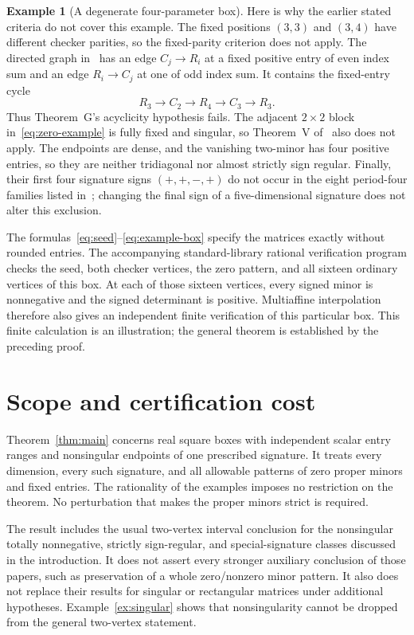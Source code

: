 \documentclass[10pt,a4paper]{article}
\theoremstyle{definition}
\newtheorem{example}[theorem]{Example}
\theoremstyle{remark}
\numberwithin{equation}{section}
\begin{document}
\begin{example}[A degenerate four-parameter box]
Here is why the earlier stated criteria do not cover this example.
The fixed positions $(3,3)$ and $(3,4)$ have different checker
parities, so the fixed-parity criterion does not apply.
The directed graph in~\cite{HoldenGraph2026} has an edge
$C_j\to R_i$ at a fixed positive entry of even index sum and
an edge $R_i\to C_j$ at one of odd index sum. It contains the
fixed-entry cycle
\[
 R_3\longrightarrow C_2\longrightarrow R_4
      \longrightarrow C_3\longrightarrow R_3.
\]
Thus Theorem~G's acyclicity hypothesis fails. The adjacent
$2\times2$ block in~\eqref{eq:zero-example} is fully fixed
and singular, so Theorem~V of~\cite{HoldenFive2026} also does
not apply. The endpoints are dense, and the vanishing two-minor
has four positive entries, so they are neither tridiagonal nor
almost strictly sign regular. Finally, their first four
signature signs $(+,+,-,+)$ do not occur in the eight
period-four families listed in~\cite{HassunehAdmGarloff2025};
changing the final sign of a five-dimensional signature does
not alter this exclusion.

The formulas~\eqref{eq:seed}--\eqref{eq:example-box} specify
the matrices exactly without rounded entries. The accompanying
standard-library rational verification program checks the seed,
both checker vertices, the zero pattern, and all sixteen
ordinary vertices of this box. At each of those sixteen
vertices, every signed minor is nonnegative and the signed
determinant is positive. Multiaffine interpolation therefore
also gives an independent finite verification of this
particular box. This finite calculation is an illustration;
the general theorem is established by the preceding proof.
\end{example}


\section{Scope and certification cost}\label{sec:scope}

Theorem~\ref{thm:main} concerns real square boxes with independent
scalar entry ranges and nonsingular endpoints of one prescribed
signature. It treats every dimension, every such signature, and
all allowable patterns of zero proper minors and fixed entries.
The rationality of the examples imposes no restriction on the
theorem. No perturbation that makes the proper minors strict
is required.

The result includes the usual two-vertex interval conclusion
for the nonsingular totally nonnegative, strictly sign-regular,
and special-signature classes discussed in the introduction.
It does not assert every stronger auxiliary conclusion of
those papers, such as preservation of a whole zero/nonzero
minor pattern. It also does not replace their results for
singular or rectangular matrices under additional hypotheses.
Example~\ref{ex:singular} shows that nonsingularity cannot be
dropped from the general two-vertex statement.
\end{document}
